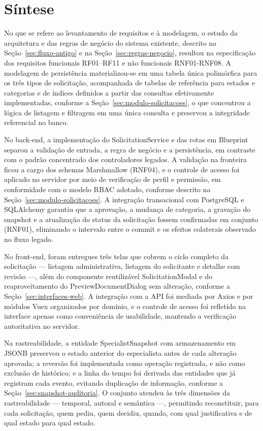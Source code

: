 \section{Síntese}
\label{sec:sintese}

No que se refere ao levantamento de requisitos e à modelagem, 
o estudo da arquitetura e das regras de negócio do sistema 
existente, descrito na Seção~\ref{sec:fluxo-antigo} e na 
Seção~\ref{sec:regras-negocio}, resultou na especificação dos 
requisitos funcionais RF01–RF11 e não funcionais RNF01-RNF08. 
A modelagem de persistência materializou-se em uma tabela única 
polimórfica para os três tipos de solicitação, acompanhada de 
tabelas de referência para estados e categorias e de índices 
definidos a partir das consultas efetivamente implementadas, 
conforme a Seção~\ref{sec:modulo-solicitacoes}, o que 
concentrou a lógica de listagem e filtragem em uma única 
consulta e preservou a integridade referencial no banco.

No back-end, a implementação do SolicitationService e das 
rotas em Blueprint separou a validação de entrada, a regra 
de negócio e a persistência, em contraste com o padrão 
concentrado dos controladores legados. A validação na 
fronteira ficou a cargo dos schemas Marshmallow (RNF04), e o 
controle de acesso foi aplicado no servidor por meio de 
verificação de perfil e permissão, em conformidade com o modelo 
RBAC adotado, conforme descrito na Seção~\ref{sec:modulo-solicitacoes}. 
A integração transacional com PostgreSQL e SQLAlchemy garantiu 
que a aprovação, a mudança de categoria, a gravação do snapshot 
e a atualização do status da solicitação fossem confirmadas em 
conjunto (RNF01), eliminando o intervalo entre o commit e os 
efeitos colaterais observado no fluxo legado.

No front-end, foram entregues três telas que cobrem o 
ciclo completo da solicitação — listagem administrativa, 
listagem do solicitante e detalhe com revisão —, além do 
componente reutilizável SolicitationModal e do reaproveitamento 
do PreviewDocumentDialog sem alteração, conforme a 
Seção~\ref{sec:interfaces-web}. A integração com a API 
foi mediada por Axios e por módulos Vuex organizados por 
domínio, e o controle de acesso foi refletido na interface 
apenas como conveniência de usabilidade, mantendo a 
verificação autoritativa no servidor.

Na rastreabilidade, a entidade SpecialistSnapshot com 
armazenamento em JSONB preservou o estado anterior do 
especialista antes de cada alteração aprovada; a reversão 
foi implementada como operação registrada, e não como 
exclusão de histórico; e a linha do tempo foi derivada 
das entidades que já registram cada evento, evitando 
duplicação de informação, conforme a Seção~\ref{sec:snapshot-auditoria}. 
O conjunto atendeu às três dimensões da 
rastreabilidade — temporal, autoral e semântica —, 
permitindo reconstituir, para cada solicitação, quem pediu,
 quem decidiu, quando, com qual justificativa e de qual estado para qual estado.

